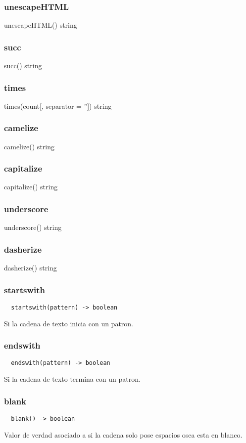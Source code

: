 {{\subsubsection*{unescapeHTML}
unescapeHTML() \rightarrow string
\subsubsection*{succ}
succ() \rightarrow string
\subsubsection*{times}
times(count[, separator = '']) \rightarrow string
\subsubsection*{camelize}
camelize() \rightarrow string
\subsubsection*{capitalize}
capitalize() \rightarrow string
\subsubsection*{underscore}
underscore() \rightarrow string
\subsubsection*{dasherize}
dasherize() \rightarrow string
\subsubsection*{startswith}
\begin{verbatim}
  startswith(pattern) -> boolean
\end{verbatim}
Si la cadena de texto inicia con un patron.

\subsubsection*{endswith}
\begin{verbatim}
  endswith(pattern) -> boolean
\end{verbatim}
Si la cadena de texto termina con un patron.

\subsubsection*{blank}
\begin{verbatim}
  blank() -> boolean
\end{verbatim}
Valor de verdad asociado a si la cadena solo pose espacios osea esta en blanco.

}}
